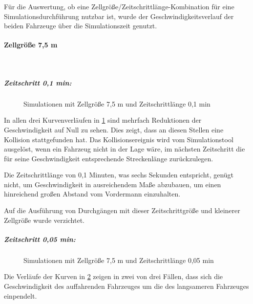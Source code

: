 Für die Auswertung, ob eine Zellgröße/Zeitschrittlänge-Kombination für eine Simulationsdurchführung nutzbar ist, wurde der Geschwindigkeitsverlauf der beiden Fahrzeuge über die Simulationszeit genutzt.


\paragraph*{Zellgröße 7,5 m} \hfill \\
\subparagraph*{Zeitschritt 0,1 min:}
\begin{figure}[hptb]
  \centering 
   \qquad 
   \qquad 
  \caption{Simulationen mit Zellgröße 7,5 m und Zeitschrittlänge 0,1 min} 
  \label{figure:run1-3}
\end{figure}
In allen drei Kurvenverläufen in \cref{figure:run1-3} sind mehrfach Reduktionen der Geschwindigkeit auf Null zu sehen. 
Dies zeigt, dass an diesen Stellen eine Kollision stattgefunden hat. Das Kollisionsereignis wird vom Simulationstool ausgelöst, wenn ein Fahrzeug nicht in der Lage wäre, im nächsten Zeitschritt die für seine Geschwindigkeit entsprechende Streckenlänge zurückzulegen.

Die Zeitschrittlänge von 0,1 Minuten, was sechs Sekunden entspricht, genügt nicht, um Geschwindigkeit in ausreichendem Maße abzubauen, um einen hinreichend großen Abstand vom Vordermann einzuhalten.

Auf die Ausführung von Durchgängen mit dieser Zeitschrittgröße und kleinerer Zellgröße wurde verzichtet.


\subparagraph*{Zeitschritt 0,05 min:}
\begin{figure}[hptb]
  \centering 
   \qquad 
   \qquad 
  \caption{Simulationen mit Zellgröße 7,5 m und Zeitschrittlänge 0,05 min} 
  \label{figure:run4-6}
\end{figure}
Die Verläufe der Kurven in \cref{figure:run4-6} zeigen in zwei von drei Fällen, dass sich die Geschwindigkeit des auffahrenden Fahrzeuges um die des langsameren Fahrzeuges einpendelt.

